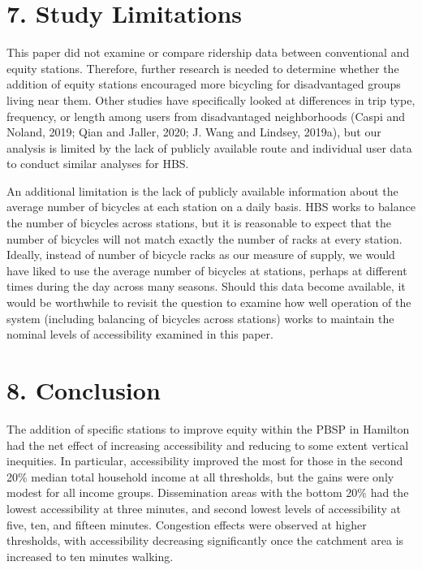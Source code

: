 \documentclass[]{elsarticle} %
\begin{document}
\hypertarget{study-limitations}{%
\section{7. Study Limitations}\label{study-limitations}}

This paper did not examine or compare ridership data between
conventional and equity stations. Therefore, further research is needed
to determine whether the addition of equity stations encouraged more
bicycling for disadvantaged groups living near them. Other studies have
specifically looked at differences in trip type, frequency, or length
among users from disadvantaged neighborhoods (Caspi and Noland, 2019;
Qian and Jaller, 2020; J. Wang and Lindsey, 2019a), but our analysis is
limited by the lack of publicly available route and individual user data
to conduct similar analyses for HBS.

An additional limitation is the lack of publicly available information
about the average number of bicycles at each station on a daily basis.
HBS works to balance the number of bicycles across stations, but it is
reasonable to expect that the number of bicycles will not match exactly
the number of racks at every station. Ideally, instead of number of
bicycle racks as our measure of supply, we would have liked to use the
average number of bicycles at stations, perhaps at different times
during the day across many seasons. Should this data become available,
it would be worthwhile to revisit the question to examine how well
operation of the system (including balancing of bicycles across
stations) works to maintain the nominal levels of accessibility examined
in this paper.

\hypertarget{conclusion}{%
\section{8. Conclusion}\label{conclusion}}

The addition of specific stations to improve equity within the PBSP in
Hamilton had the net effect of increasing accessibility and reducing to
some extent vertical inequities. In particular, accessibility improved
the most for those in the second 20\% median total household income at
all thresholds, but the gains were only modest for all income groups.
Dissemination areas with the bottom 20\% had the lowest accessibility at
three minutes, and second lowest levels of accessibility at five, ten,
and fifteen minutes. Congestion effects were observed at higher
thresholds, with accessibility decreasing significantly once the
catchment area is increased to ten minutes walking.
\end{document}
